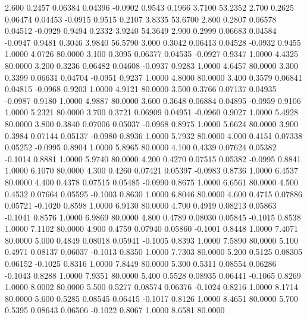    2.600   0.2457   0.06384   0.04396  -0.0902   0.9543   0.1966   3.7100  53.2352
   2.700   0.2625   0.06474   0.04453  -0.0915   0.9515   0.2107   3.8335  53.6700
   2.800   0.2807   0.06578   0.04512  -0.0929   0.9494   0.2332   3.9240  54.3649
   2.900   0.2999   0.06683   0.04584  -0.0947   0.9481   0.3046   3.9840  56.5790
   3.000   0.3042   0.06413   0.04528  -0.0932   0.9455   1.0000   4.0726  80.0000
   3.100   0.3095   0.06377   0.04535  -0.0927   0.9347   1.0000   4.4325  80.0000
   3.200   0.3236   0.06482   0.04608  -0.0937   0.9283   1.0000   4.6457  80.0000
   3.300   0.3399   0.06631   0.04704  -0.0951   0.9237   1.0000   4.8000  80.0000
   3.400   0.3579   0.06841   0.04815  -0.0968   0.9203   1.0000   4.9121  80.0000
   3.500   0.3766   0.07137   0.04935  -0.0987   0.9180   1.0000   4.9887  80.0000
   3.600   0.3648   0.06884   0.04895  -0.0959   0.9106   1.0000   5.2321  80.0000
   3.700   0.3721   0.06909   0.04951  -0.0960   0.9027   1.0000   5.4928  80.0000
   3.800   0.3840   0.07006   0.05037  -0.0968   0.8975   1.0000   5.6624  80.0000
   3.900   0.3984   0.07144   0.05137  -0.0980   0.8936   1.0000   5.7932  80.0000
   4.000   0.4151   0.07338   0.05252  -0.0995   0.8904   1.0000   5.8965  80.0000
   4.100   0.4339   0.07624   0.05382  -0.1014   0.8881   1.0000   5.9740  80.0000
   4.200   0.4270   0.07515   0.05382  -0.0995   0.8841   1.0000   6.1070  80.0000
   4.300   0.4260   0.07421   0.05397  -0.0983   0.8736   1.0000   6.4537  80.0000
   4.400   0.4378   0.07515   0.05485  -0.0990   0.8675   1.0000   6.6561  80.0000
   4.500   0.4532   0.07664   0.05595  -0.1003   0.8630   1.0000   6.8046  80.0000
   4.600   0.4715   0.07886   0.05721  -0.1020   0.8598   1.0000   6.9130  80.0000
   4.700   0.4919   0.08213   0.05863  -0.1041   0.8576   1.0000   6.9869  80.0000
   4.800   0.4789   0.08030   0.05845  -0.1015   0.8538   1.0000   7.1102  80.0000
   4.900   0.4759   0.07940   0.05860  -0.1001   0.8448   1.0000   7.4071  80.0000
   5.000   0.4849   0.08018   0.05941  -0.1005   0.8393   1.0000   7.5890  80.0000
   5.100   0.4971   0.08137   0.06037  -0.1013   0.8350   1.0000   7.7303  80.0000
   5.200   0.5125   0.08305   0.06152  -0.1025   0.8316   1.0000   7.8449  80.0000
   5.300   0.5311   0.08554   0.06286  -0.1043   0.8288   1.0000   7.9351  80.0000
   5.400   0.5528   0.08935   0.06441  -0.1065   0.8269   1.0000   8.0002  80.0000
   5.500   0.5277   0.08574   0.06376  -0.1024   0.8216   1.0000   8.1714  80.0000
   5.600   0.5285   0.08545   0.06415  -0.1017   0.8126   1.0000   8.4651  80.0000
   5.700   0.5395   0.08643   0.06506  -0.1022   0.8067   1.0000   8.6581  80.0000
